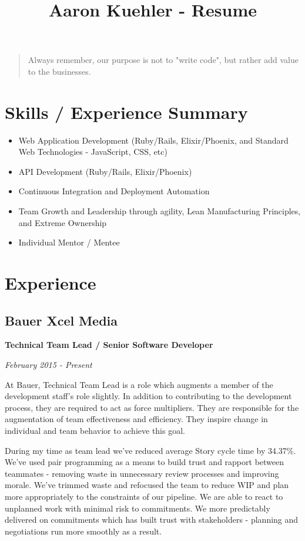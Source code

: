 \documentclass[12pt letterpaper notitlepage]{article}
\date{}
\title{Aaron Kuehler - Resume}
\begin{document}
\maketitle
\begin{quote}
Always remember, our purpose is not to "write code", but rather add
value to the businesses.
\end{quote}

\section*{Skills / Experience Summary}
\label{sec-1}

\begin{itemize}
\item Web Application Development (Ruby/Rails, Elixir/Phoenix, and Standard Web Technologies - JavaScript, CSS, etc)
\item API Development (Ruby/Rails, Elixir/Phoenix)
\item Continuous Integration and Deployment Automation
\item Team Growth and Leadership through agility, Lean Manufacturing Principles, and Extreme Ownership
\item Individual Mentor / Mentee
\end{itemize}

\section*{Experience}
\label{sec-2}

\subsection*{Bauer Xcel Media}
\label{sec-2-1}

\textbf{Technical Team Lead / Senior Software Developer}

\emph{February 2015 - Present}

At Bauer, Technical Team Lead is a role which augments a member of the
development staff's role slightly. In addition to contributing to the
development process, they are required to act as force multipliers. They are
responsible for the augmentation of team effectiveness and efficiency. They
inspire change in individual and team behavior to achieve this goal.

During my time as team lead we've reduced average Story cycle time by
34.37\%. We've used pair programming as a means to build trust and rapport
between teammates - removing waste in unnecessary review processes and improving
morale. We've trimmed waste and refocused the team to reduce WIP and plan more
appropriately to the constraints of our pipeline. We are able to react to
unplanned work with minimal risk to commitments. We more predictably delivered
on commitments which has built trust with stakeholders - planning and
negotiations run more smoothly as a result.
\end{document}
